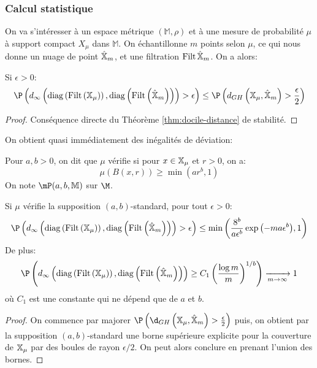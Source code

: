 \subsubsection{Calcul statistique}
On va s'intéresser à un espace métrique $(\mathbb{M}, \rho)$ et à une mesure de probabilité $\mu$ à support compact $X_{\mu}$ dans $\mathbb{M}$.
On échantillonne $m$ points selon $\mu$, ce qui nous donne un nuage de point $\hat{\mathbb{X}}_{m}$, et une filtration
$\operatorname{Filt}{\hat{\mathbb{X}}_{m}}$.
On a alors:
\begin{proposition}
	Si $\epsilon > 0$:
	\begin{equation*}
		\P\left(\dinf\left(\diag\left(\filt\left(\X_{\mu}\right)\right), \diag\left(\filt\left(\hatx{m}\right)\right)\right) > \epsilon\right) \leq \P\left(d_{GH}\left(\X_{\mu}, \hatx{m}\right) > \frac{\epsilon}{2}\right)
	\end{equation*}
\end{proposition}
\begin{proof}
	Conséquence directe du Théorème \ref{thm:docile-distance} de stabilité.
\end{proof}

On obtient quasi immédiatement des inégalités de déviation:
\begin{definition}
	Pour $a, b > 0$, on dit que $\mu$ vérifie  si pour $x \in \mathbb{X}_{\mu}$ et $r > 0$, on a:
	\begin{equation*}
		\mu(B(x, r)) \geq \min(ar^{b}, 1)
	\end{equation*}
	On note $\mP(a, b, \mathbb{M})$  sur $\M$.
\end{definition}
\begin{thm}
	Si $\mu$ vérifie la supposition $(a, b)$-standard, pour tout $\epsilon > 0$:
	\begin{equation*}
		\P\left(\dinf\left(\diag\left(\filt\left(\X_{\mu}\right)\right), \diag\left(\filt\left(\hatx{m}\right)\right)\right) > \epsilon\right) \leq \min \left(\frac{8^{b}}{a\epsilon^{b}}\exp{\left(-ma\epsilon^{b}\right)}, 1\right)
	\end{equation*}
	De plus:
	\begin{equation*}
		\P\left(\dinf\left(\diag\left(\filt\left(\X_{\mu}\right)\right), \diag\left(\filt\left(\hatx{m}\right)\right)\right) \geq C_{1} \left(\frac{\log{m}}{m}\right)^{1 / b}\right) \xrightarrow[m \to \infty]{} 1
	\end{equation*}
	où $C_{1}$ est une constante qui ne dépend que de $a$ et $b$.
\end{thm}
\begin{proof}
	On commence par majorer $\P\left(\d_{GH}\left(\X_{\mu}, \hatx{m}\right) > \frac{\epsilon}{2}\right)$ puis,
	on obtient par la supposition $(a, b)$-standard une borne supérieure explicite pour la couverture de $\mathbb{X}_{\mu}$ par des boules de rayon $\epsilon / 2$.
	On peut alors conclure en prenant l'union des bornes.
\end{proof}

